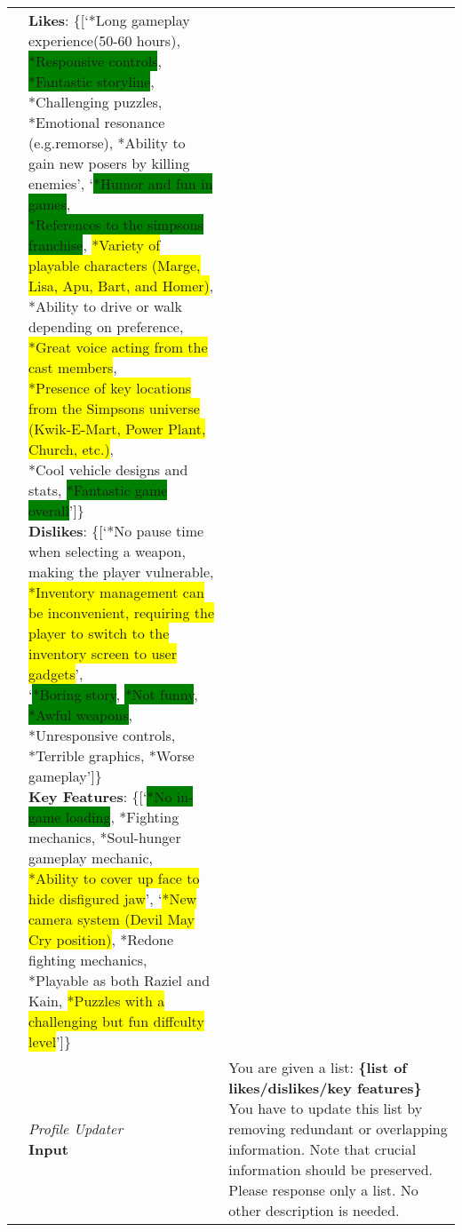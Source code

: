 \begin{table*}[t]
\begin{tabular}{@{}lll@{}}
    &        \makecell[l]{\textbf{Likes}: \{[`*Long gameplay experience(50-60 hours), \colorbox{green}{*Responsive controls}, \colorbox{green}{*Fantastic storyline}, *Challenging puzzles, \\ *Emotional resonance (e.g.remorse), *Ability to gain new posers by killing enemies', `\colorbox{green}{*Humor and fun in games}, \\\colorbox{green}{*References to the simpsons franchise}, \colorbox{yellow}{*Variety of playable characters (Marge, Lisa, Apu, Bart, and Homer)}, \\ *Ability to drive or walk depending on preference, \colorbox{yellow}{*Great voice acting from the cast members}, \\\colorbox{yellow}{*Presence of key locations from the Simpsons universe (Kwik-E-Mart, Power Plant, Church, etc.)}, \\ *Cool vehicle designs and stats, \colorbox{green}{*Fantastic game overall}']\}\\ \textbf{Dislikes}: \{[`*No pause time when selecting a weapon, making the player vulnerable, \\\colorbox{yellow}{*Inventory management can be inconvenient, requiring the player to switch to the inventory screen to user gadgets}', \\`\colorbox{green}{*Boring story}, \colorbox{green}{*Not funny}, \colorbox{green}{*Awful weapons}, *Unresponsive controls, *Terrible graphics, *Worse gameplay']\} \\\textbf{Key Features}: \{[`\colorbox{green}{*No in-game loading}, *Fighting mechanics, *Soul-hunger gameplay mechanic, \\\colorbox{yellow}{*Ability to cover up face to hide disfigured jaw}', `\colorbox{yellow}{*New camera system (Devil May Cry position)}, *Redone fighting mechanics, \\ *Playable as both Raziel and Kain, \colorbox{yellow}{*Puzzles with a challenging but fun diffculty level}']\}}\\\cmidrule(lr){2-3}
    &  \makecell[l]{\emph{Profile Updater} \\ \textbf{Input}}      
    &        \makecell[l]{
    You are given a list: \textbf{\{list of likes/dislikes/key features\}}
    \\You have to update this list by removing redundant or overlapping information. Note that crucial information should be preserved.
    \\Please response only a list. No other description is needed.
    }\\ \cmidrule(lr){2-3}

\end{tabular}
\end{table*}
